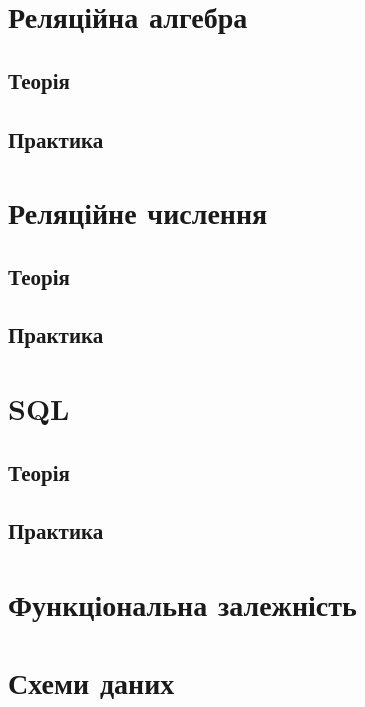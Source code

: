 




\section{Реляційна алгебра}
    \subsection{Теорія}
        
    \subsection{Практика}
        


\section{Реляційне числення}
    \subsection{Теорія}
        
    \subsection{Практика}
        


\section{SQL}
    \subsection{Теорія}
        
    \subsection{Практика}
        

\section{Функціональна залежність}
    

\section{Схеми даних}
